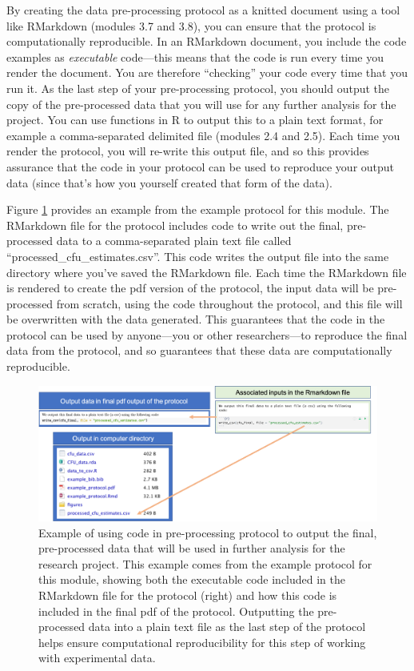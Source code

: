 \documentclass[]{tufte-book}
\begin{document}
By creating the data pre-processing protocol as a knitted document
using a tool like RMarkdown (modules 3.7 and 3.8), you can ensure that the protocol is
computationally reproducible. In an RMarkdown document, you include the code
examples as \emph{executable} code---this means that the code is run every time you
render the document. You are therefore ``checking'' your code every time that you
run it. As the last step of your pre-processing protocol, you should output the
copy of the pre-processed data that you will use for any further analysis for
the project. You can use functions in R to output this to a plain text format,
for example a comma-separated delimited file (modules 2.4 and 2.5). Each time you render
the protocol, you will re-write this output file, and so this provides assurance
that the code in your protocol can be used to reproduce your output data (since
that's how you yourself created that form of the data).

Figure \ref{fig:protocoloutput} provides an example from the example protocol
for this module. The RMarkdown file for the protocol includes code to write out
the final, pre-processed data to a comma-separated plain text file called
``processed\_cfu\_estimates.csv''. This code writes the output file into the same
directory where you've saved the RMarkdown file. Each time the RMarkdown file is
rendered to create the pdf version of the protocol, the input data will be
pre-processed from scratch, using the code throughout the protocol, and this
file will be overwritten with the data generated. This guarantees that the code
in the protocol can be used by anyone---you or other researchers---to reproduce
the final data from the protocol, and so guarantees that these data are
computationally reproducible.

\begin{figure}
\includegraphics[width=\textwidth]{figures/protocol_output_data} \caption[Example of using code in pre-processing protocol to output the final, pre-processed data that will be used in further analysis for the research project]{Example of using code in pre-processing protocol to output the final, pre-processed data that will be used in further analysis for the research project. This example comes from the example protocol for this module, showing both the executable code included in the RMarkdown file for the protocol (right) and how this code is included in the final pdf of the protocol. Outputting the pre-processed data into a plain text file as the last step of the protocol helps ensure computational reproducibility for this step of working with experimental data.}\label{fig:protocoloutput}
\end{figure}
\end{document}
